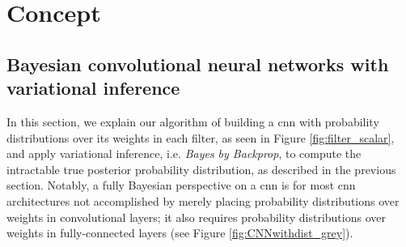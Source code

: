 

\chapter{Concept}

\ifpdf
    \graphicspath{{Chapter2/Figs/Raster/}{Chapter2/Figs/PDF/}{Chapter2/Figs/}}
\else
    \graphicspath{{Chapter2/Figs/Vector/}{Chapter2/Figs/}}
\fi

\section{Bayesian convolutional neural networks with variational inference}
In this section, we explain our algorithm of building a \ac{cnn} with probability distributions over its weights in each filter, as seen in Figure \ref{fig:filter_scalar}, and apply variational inference, i.e. \textit{Bayes by Backprop}, to compute the intractable true posterior probability distribution, as described in the previous section. Notably, a fully Bayesian perspective on a \ac{cnn} is for most \ac{cnn} architectures not accomplished by merely placing probability distributions over weights in convolutional layers; it also requires probability distributions over weights in fully-connected layers (see Figure \ref{fig:CNNwithdist_grey}). 
%
